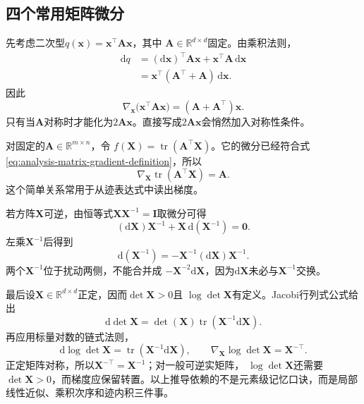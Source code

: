 \subsection{四个常用矩阵微分}

先考虑二次型$q(\bm{x})=\bm{x}^{\top}\bm{A}\bm{x}$，其中 $\bm{A}\in\mathbb{R}^{d\times d}$固定。由乘积法则，
\begin{align*}
  \mathrm{d}q
  &=
  (\mathrm{d}\bm{x})^{\top}\bm{A}\bm{x}
  +\bm{x}^{\top}\bm{A}\,\mathrm{d}\bm{x}\\
  &=
  \bm{x}^{\top}(\bm{A}^{\top}+\bm{A})\,\mathrm{d}\bm{x}.
\end{align*}
因此
\begin{equation}
  \nabla_{\bm{x}}
  \bigl(\bm{x}^{\top}\bm{A}\bm{x}\bigr)
  =
  (\bm{A}+\bm{A}^{\top})\bm{x}.
\label{eq:analysis-quadratic-form-gradient}
\end{equation}
只有当$\bm{A}$对称时才能化为$2\bm{A}\bm{x}$。直接写成$2\bm{A}\bm{x}$会悄然加入对称性条件。

对固定的$\bm{A}\in\mathbb{R}^{m\times n}$，令 $f(\bm{X})=\operatorname{tr}(\bm{A}^{\top}\bm{X})$。它的微分已经符合式
\eqref{eq:analysis-matrix-gradient-definition}，所以
\begin{equation}
  \nabla_{\bm{X}}\operatorname{tr}(\bm{A}^{\top}\bm{X})
  =\bm{A}.
\label{eq:analysis-trace-linear-gradient}
\end{equation}
这个简单关系常用于从迹表达式中读出梯度。

若方阵$\bm{X}$可逆，由恒等式$\bm{X}\bm{X}^{-1}=\bm{I}$取微分可得
\[   (\mathrm{d}\bm{X})\bm{X}^{-1}   +\bm{X}\,\mathrm{d}(\bm{X}^{-1})=\bm{0}. \]
左乘$\bm{X}^{-1}$后得到
\begin{equation}
  \mathrm{d}(\bm{X}^{-1})
  =
  -\bm{X}^{-1}(\mathrm{d}\bm{X})\bm{X}^{-1}.
\label{eq:analysis-inverse-differential}
\end{equation}
两个$\bm{X}^{-1}$位于扰动两侧，不能合并成 $-\bm{X}^{-2}\mathrm{d}\bm{X}$，因为$\mathrm{d}\bm{X}$未必与$\bm{X}^{-1}$交换。

最后设$\bm{X}\in\mathbb{R}^{d\times d}$正定，因而$\det\bm{X}>0$且 $\log\det\bm{X}$有定义。Jacobi行列式公式给出
\[   \mathrm{d}\det\bm{X}   =   \det(\bm{X})\operatorname{tr}   (\bm{X}^{-1}\mathrm{d}\bm{X}). \]
再应用标量对数的链式法则，
\begin{equation}
  \mathrm{d}\log\det\bm{X}
  =
  \operatorname{tr}(\bm{X}^{-1}\mathrm{d}\bm{X}),
  \qquad
  \nabla_{\bm{X}}\log\det\bm{X}
  =
  \bm{X}^{-\top}.
\label{eq:analysis-logdet-gradient}
\end{equation}
正定矩阵对称，所以$\bm{X}^{-\top}=\bm{X}^{-1}$；对一般可逆实矩阵， $\log\det\bm{X}$还需要$\det\bm{X}>0$，而梯度应保留转置。以上推导依赖的不是元素级记忆口诀，而是局部线性近似、乘积次序和迹内积三件事。

